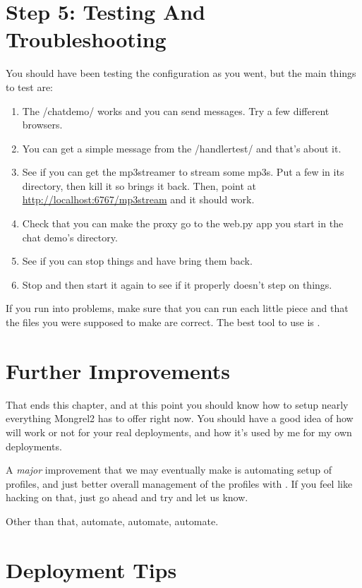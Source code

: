 \section{Step 5: Testing And Troubleshooting}

You should have been testing the configuration as you went, but the
main things to test are:

\begin{enumerate}
\item The /chatdemo/ works and you can send messages. Try a few different
    browsers.
\item You can get a simple message from the /handlertest/ and that's about it.
\item See if you can get the mp3streamer to stream some mp3s.  Put a few
    in its directory, then kill it so  brings it back.  Then,
    point  at \url{http://localhost:6767/mp3stream} and
    it should work.
\item Check that you can make the proxy go to the web.py app you start
    in the chat demo's directory.
\item See if you can stop things and have  bring them back.
\item Stop  and then start it again to see if it properly
    doesn't step on things.
\end{enumerate}

If you run into problems, make sure that you can run each little
piece and that the files you were supposed to make are correct.
The best tool to use is .

\section{Further Improvements}

That ends this chapter, and at this point you should know how to setup
nearly everything Mongrel2 has to offer right now.  You should have a good
idea of how  will work or not for your real deployments, and
how it's used by me for my own deployments.

A \emph{major} improvement that we may eventually make is automating
setup of  profiles, and just better overall management
of the profiles with .  If you feel like hacking on that,
just go ahead and try and let us know.

Other than that, automate, automate, automate.

\section{Deployment Tips}

